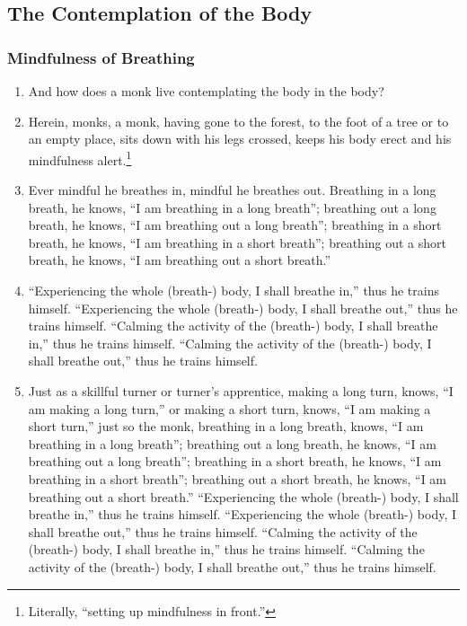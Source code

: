 \documentclass[a4 paper, 12pt]{article}
\begin{document}
\begin{multicols}{2}
\subsection*{The Contemplation of the Body}
\subsubsection*{Mindfulness of Breathing}
\begin{enumerate}[resume]
\item And how does a monk live contemplating the body in the body?
\item Herein, monks, a monk, having gone to the forest, to the foot of a tree or to an empty place, sits down with his legs crossed, keeps his body erect and his mindfulness alert.\footnote{Literally, “setting up mindfulness in front.”}
\item Ever mindful he breathes in, mindful he breathes out. Breathing in a long breath, he knows, “I am breathing in a long breath”; breathing out a long breath, he knows, “I am breathing out a long breath”; breathing in a short breath, he knows, “I am breathing in a short breath”; breathing out a short breath, he knows, “I am breathing out a short breath.”
\item “Experiencing the whole (breath-) body, I shall breathe in,” thus he trains himself. “Experiencing the whole (breath-) body, I shall breathe out,” thus he trains himself. “Calming the activity of the (breath-) body, I shall breathe in,” thus he trains himself. “Calming the activity of the (breath-) body, I shall breathe out,” thus he trains himself.
\item Just as a skillful turner or turner's apprentice, making a long turn, knows, ``I am making a long turn,'' or making a short turn, knows, ``I am making a short turn,'' just so the monk, breathing in a long breath, knows, ``I am breathing in a long breath''; breathing out a long breath, he knows, ``I am breathing out a long breath''; breathing in
a short breath, he knows, “I am breathing in a short breath”; breathing out a short breath, he knows, “I am breathing out a short breath.” “Experiencing the whole (breath-) body, I shall breathe in,” thus he trains himself. “Experiencing the whole (breath-) body, I shall breathe out,” thus he trains himself. “Calming the activity of the (breath-) body, I shall breathe in,” thus he trains himself. “Calming the activity of the (breath-) body, I shall breathe out,” thus he trains himself.

\end{enumerate}
\end{multicols}
\end{document}

